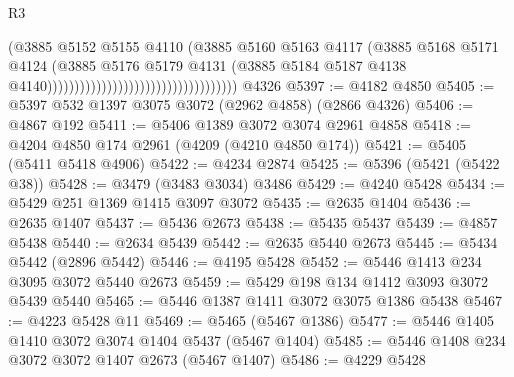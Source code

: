 \begin{lexlean}{R3}
\begin{coremodule}
                                                                (@3885
                                                                  @5152
                                                                  @5155
                                                                  @4110
                                                                  (@3885
                                                                    @5160
                                                                    @5163
                                                                    @4117
                                                                    (@3885
                                                                      @5168
                                                                      @5171
                                                                      @4124
                                                                      (@3885
                                                                        @5176
                                                                        @5179
                                                                        @4131
                                                                        (@3885
                                                                          @5184
                                                                          @5187
                                                                          @4138
                                                                          @4140)))))))))))))))))))))))))))))))))))
    @4326
@5397 := @4182 @4850
@5405 := @5397 @532 @1397 @3075 @3072 (@2962 @4858) (@2866 @4326)
@5406 := @4867 @192
@5411 := @5406 @1389 @3072 @3074 @2961 @4858
@5418 := @4204 @4850 @174 @2961 (@4209 (@4210 @4850 @174))
@5421 := @5405 (@5411 @5418 @4906)
@5422 := @4234 @2874
@5425 := @5396 (@5421 (@5422 @38))
@5428 := @3479 (@3483 @3034) @3486
@5429 := @4240 @5428
@5434 := @5429 @251 @1369 @1415 @3097 @3072
@5435 := @2635 @1404
@5436 := @2635 @1407
@5437 := @5436 @2673
@5438 := @5435 @5437
@5439 := @4857 @5438
@5440 := @2634 @5439
@5442 := @2635 @5440 @2673
@5445 := @5434 @5442 (@2896 @5442)
@5446 := @4195 @5428
@5452 := @5446 @1413 @234 @3095 @3072 @5440 @2673
@5459 := @5429 @198 @134 @1412 @3093 @3072 @5439 @5440
@5465 := @5446 @1387 @1411 @3072 @3075 @1386 @5438
@5467 := @4223 @5428 @11
@5469 := @5465 (@5467 @1386)
@5477 := @5446 @1405 @1410 @3072 @3074 @1404 @5437 (@5467 @1404)
@5485 := @5446 @1408 @234 @3072 @3072 @1407 @2673 (@5467 @1407)
@5486 := @4229 @5428

\end{coremodule}
\end{lexlean}
